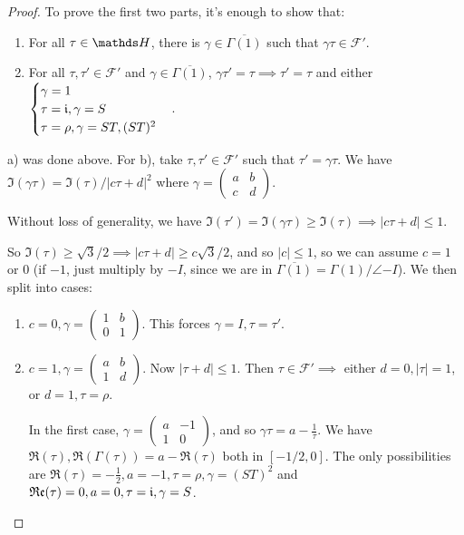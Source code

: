 \documentclass[10pt,a4paper]{article}
\begin{document}
\begin{proof}
  To prove the first two parts, it's enough to show that:
  \begin{enumerate}[label=\alph*)]
    \item For all $\tau \in \H$, there is $\gamma \in \overline{\Gamma(1)}$ such that $\gamma\tau \in \mathscr{F}'$.
    \item For all $\tau, \tau' \in \mathscr{F}'$ and $\gamma \in \overline{\Gamma(1)}$, $\gamma\tau'=\tau \implies \tau'=\tau$ and either $\begin{cases} \gamma=1\\\tau=\mathfrak{i}, \gamma=S\\\tau=\rho, \gamma=ST, (ST)^2\end{cases}$.
  \end{enumerate}
  a) was done above. For b), take $\tau,\tau' \in \mathscr{F}'$ such that $\tau' = \gamma\tau$. We have $\Im(\gamma\tau) = \Im(\tau)/|c\tau+d|^2$ where $\gamma = \begin{pmatrix}a&b\\c&d\end{pmatrix}$.

  Without loss of generality, we have $\Im(\tau') = \Im(\gamma\tau) \geq \Im(\tau)\implies |c\tau+d|\leq 1$.

  So $\Im(\tau) \geq \sqrt{3}/2 \implies |c\tau+d| \geq c\sqrt{3}/2$, and so $|c| \leq 1$, so we can assume $c = 1$ or $0$ (if $-1$, just multiply by $-I$, since we are in $\overline{\Gamma(1)} = \Gamma(1)/\angle{-I}$). We then split into cases:
  \begin{enumerate}
    \item $c = 0, \gamma = \begin{pmatrix}1&b\\0&1\end{pmatrix}$. This forces $\gamma = I, \tau=\tau'$.
    \item $c = 1, \gamma = \begin{pmatrix}a&b\\1&d\end{pmatrix}$. Now $|\tau+d| \leq 1$. Then $\tau \in \mathscr{F}' \implies$ either $d = 0, |\tau| = 1$, or $d = 1, \tau=\rho$.

    In the first case, $\gamma = \begin{pmatrix} a&-1\\1&0\end{pmatrix}$, and so $\gamma\tau = a-\frac1\tau$. We have $\Re(\tau), \Re(\Gamma(\tau)) = a - \Re(\tau)$ both in $[-1/2,0]$. The only possibilities are $\Re(\tau) = -\frac12, a = -1, \tau=\rho, \gamma=(ST)^2$ and $\operatorname{\mathfrak{Re}}(\tau) = 0, a = 0, \tau = \mathfrak{i}, \gamma=S$.


\end{enumerate}
\end{proof}
\end{document}
